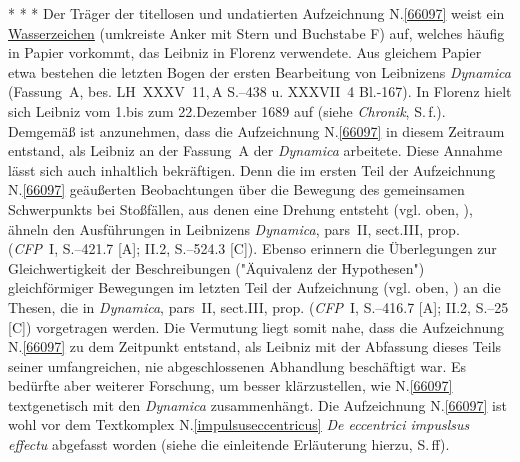 \vspace{3.0em}%
\pstart%
\noindent%
\centering%
*     *     *
\pend%
\vspace{2.5em}%
%
\frenchspacing%
\footnotesize%
\pstart%
\noindent%
%
Der Träger der titellosen und undatierten Aufzeichnung N.\;\ref{66097} weist ein \href{\Scan{LH_35_10_11_088wz}}{Wasserzeichen} (umkreiste Anker mit Stern und Buchstabe F) auf, welches häufig in Papier vorkommt, das Leibniz in Florenz verwendete.
Aus gleichem Papier etwa bestehen die letzten Bogen der ersten Bearbeitung von Leibnizens \textit{Dynamica}\cite{01354} (Fassung~A, bes. LH~XXXV~11,\,A S.--438 u. XXXVII~4 Bl.-167).
In Florenz hielt sich Leibniz vom 1.\;bis zum 22.\;Dezember 1689 auf (siehe \textit{Chronik}, S.\,f.).\cite{01236}
Demgemäß ist anzunehmen, dass die Aufzeichnung N.\;\ref{66097} in diesem Zeitraum entstand, als Leibniz an der Fassung~A der \textit{Dynamica}\cite{01354} arbeitete.
\pend%
\pstart%
Diese Annahme lässt sich auch inhaltlich bekräftigen.
Denn die im ersten Teil der Aufzeichnung N.\;\ref{66097} geäußerten Beobachtungen über die Bewegung des gemeinsamen Schwerpunkts bei Stoßfällen, aus denen eine Drehung entsteht (vgl. oben, ), ähneln den Ausführungen in Leibnizens \textit{Dynamica}, pars~II, sect.\;III, prop.\cite{01354} (\textit{CFP}~I, S.--421.7 [A]; II.2, S.--524.3 [C]).\cite{01482} %
Ebenso erinnern die Überlegungen zur Gleichwertigkeit der Beschreibungen ("Äquivalenz der Hypothesen") gleichförmiger Bewegungen im letzten Teil der Aufzeichnung (vgl. oben, ) an die Thesen, die in \textit{Dynamica}, pars~II, sect.\;III, prop.\cite{01354} (\textit{CFP}~I, S.--416.7 [A]; II.2, S.--25 [C])\cite{01482} %
vorgetragen werden.
Die Vermutung liegt somit nahe, dass die Aufzeichnung N.\;\ref{66097} zu dem Zeitpunkt entstand, als Leibniz mit der Abfassung dieses Teils seiner umfangreichen, nie abgeschlossenen Abhandlung beschäftigt war.
Es bedürfte aber weiterer Forschung, um besser klärzustellen, wie N.\;\ref{66097} textgenetisch mit den \textit{Dynamica}\cite{01354} zusammenhängt.
\pend%
\pstart%
Die Aufzeichnung N.\;\ref{66097} ist wohl vor dem Textkomplex N.\;\ref{impulsuseccentricus} \textit{De eccentrici impuslsus effectu} abgefasst worden (siehe die einleitende Erläuterung hierzu, S.\pageref{impulsecc_intro}\,ff).
\pend%
%
\frenchspacing%
\normalsize%
